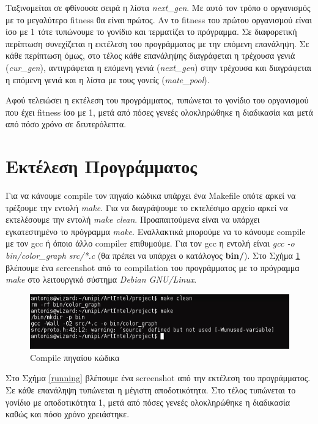 \documentclass{article}
\begin{document}
Ταξινομείται σε φθίνουσα σειρά η λίστα \emph{next\_gen}. Με αυτό τον τρόπο ο
οργανισμός με το μεγαλύτερο fitness θα είναι πρώτος. Αν το fitness του πρώτου
οργανισμού είναι ίσο με 1 τότε τυπώνουμε το γονίδιο και τερματίζει το πρόγραμμα.
Σε διαφορετική περίπτωση συνεχίζεται η εκτέλεση του προγράμματος με την επόμενη
επανάληψη. Σε κάθε περίπτωση όμως, στο τέλος κάθε επανάληψης διαγράφεται η
τρέχουσα γενιά (\emph{cur\_gen}), αντιγράφεται η επόμενη γενιά
(\emph{next\_gen}) στην τρέχουσα και διαγράφεται η επόμενη γενιά και η λίστα με
τους γονείς (\emph{mate\_pool}).

Αφού τελειώσει η εκτέλεση του προγράμματος, τυπώνεται το γονίδιο του οργανισμού
που έχει fitness ίσο με 1, μετά από πόσες γενεές ολοκληρώθηκε η διαδικασία και
μετά από πόσο χρόνο σε δευτερόλεπτα.

\section{Εκτέλεση Προγράμματος}
Για να κάνουμε compile τον πηγαίο κώδικα υπάρχει ένα Makefile οπότε αρκεί να
τρέξουμε την εντολή \emph{make}. Για να διαγράψουμε το εκτελέσιμο αρχείο αρκεί
να εκτελέσουμε την εντολή \emph{make clean}. Προαπαιτούμενα είναι να υπάρχει
εγκατεστημένο το
πρόγραμμα \emph{make}. Εναλλακτικά μπορούμε να το κάνουμε compile με τον gcc ή
όποιο άλλο compiler επιθυμούμε. Για τον gcc η εντολή είναι \emph{gcc -o
bin/color\_graph src/*.c} (θα πρέπει να υπάρχει ο κατάλογος \textbf{bin/}).
Στο Σχήμα \ref{compile} βλέπουμε ένα screenshot από το compilation του προγράμματος
με το πρόγραμμα \emph{make} στο λειτουργικό σύστημα \emph{Debian GNU/Linux}.
\begin{figure}[tbh]
\centering
\includegraphics[scale=0.7]{make.png}
\caption{Compile πηγαίου κώδικα}
\label{compile}
\end{figure}

Στο Σχήμα \ref{running} βλέπουμε ένα screenshot από την εκτέλεση του
προγράμματος. Σε κάθε επανάληψη τυπώνεται η μέγιστη αποδοτικότητα. Στο
τέλος τυπώνεται το γονίδιο με αποδοτικότητα 1, μετά από πόσες γενεές
ολοκληρώθηκε η διαδικασία καθώς και πόσο χρόνο χρειάστηκε.
\end{document}
